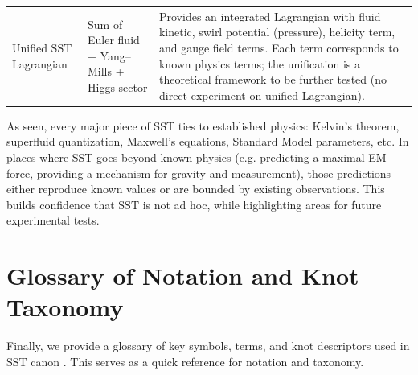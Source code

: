 \documentclass[10pt,reprint,aps,onecolumn,nofootinbib]{revtex4-2}
\begin{document}
\begin{table}[hbt!]
\begin{ruledtabular}
\begin{tabular}{|p{3.0cm} p{4.0cm} p{8.0cm}|}
				Unified SST Lagrangian & Sum of Euler fluid + Yang–Mills + Higgs sector & Provides an integrated Lagrangian with fluid kinetic, swirl potential (pressure), helicity term, and gauge field terms. Each term corresponds to known physics terms; the unification is a theoretical framework to be further tested (no direct experiment on unified Lagrangian). \\
			\end{tabular}
		\end{ruledtabular}
	\end{table}

	As seen, every major piece of SST ties to established physics: Kelvin’s theorem, superfluid quantization, Maxwell’s equations, Standard Model parameters, etc. In places where SST goes beyond known physics (e.g. predicting a maximal EM force, providing a mechanism for gravity and measurement), those predictions either reproduce known values or are bounded by existing observations. This builds confidence that SST is not ad hoc, while highlighting areas for future experimental tests.

	\section{Glossary of Notation and Knot Taxonomy}
	Finally, we provide a glossary of key symbols, terms, and knot descriptors used in SST canon \canonversion. This serves as a quick reference for notation and taxonomy.
\end{document}
